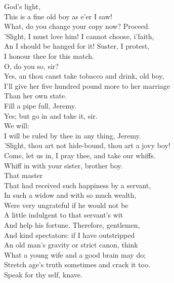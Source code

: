 \documentclass[a4paper,oneside,12pt]{memoir}
\begin{document}
\begin{drama*}
\kastrilspeaks {} God's light,\\
This is a fine old boy as e'er I saw!\\
\lovewitspeaks What, do you change your copy now? Proceed.\\
\kastrilspeaks 'Slight, I must love him! I cannot choose, i'faith,\\
An I should be hanged for it! Suster, I protest,\\
I honour thee for this match.\\
\lovewitspeaks {} O, do you so, sir?\\
\kastrilspeaks Yes, an thou canst take tobacco and drink, old boy,\\
I'll give her five hundred pound more to her marriage\\
Than her own state.\\
\lovewitspeaks {} Fill a pipe full, Jeremy.\\
\facespeaks Yes; but go in and take it, sir.\\
\lovewitspeaks {} We will:\\
I will be ruled by thee in any thing, Jeremy.\\
\kastrilspeaks 'Slight, thou art not hide-bound, thou art a jovy boy!\\
Come, let us in, I pray thee, and take our whiffs.\\
\lovewitspeaks Whiff in with your sister, brother boy.\\
 That master\\
That had received such happiness by a servant,\\
In such a widow and with so much wealth,\\
Were very ungrateful if he would not be\\
A little indulgent to that servant's wit\\
And help his fortune. Therefore, gentlemen,\\
And kind spectators: if I have outstripped\\
An old man's gravity or strict canon, think\\
What a young wife and a good brain may do;\\
Stretch age's truth sometimes and crack it too.\\
Speak for thy self, knave.\\

\end{drama*}
\end{document}

